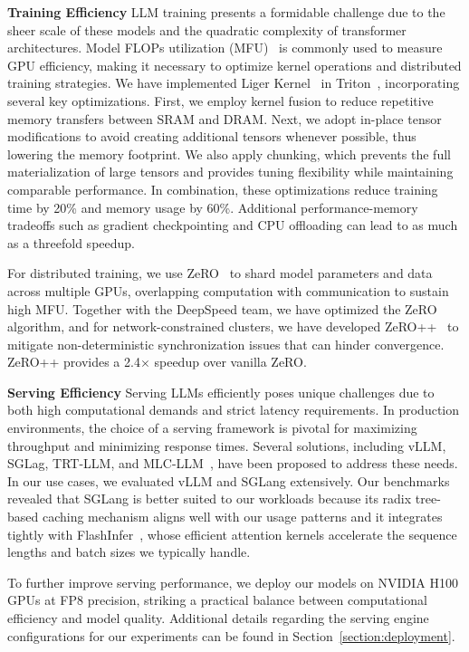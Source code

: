 \noindent
\textbf{Training Efficiency} LLM training presents a formidable challenge due to the sheer scale of these models and the quadratic complexity of transformer architectures. Model FLOPs utilization (MFU)~\cite{chowdhery2023palm} is commonly used to measure GPU efficiency, making it necessary to optimize kernel operations and distributed training strategies. We have implemented Liger Kernel~\cite{hsu2024liger} in Triton~\cite{tillet2019triton}, incorporating several key optimizations. First, we employ kernel fusion to reduce repetitive memory transfers between SRAM and DRAM. Next, we adopt in-place tensor modifications to avoid creating additional tensors whenever possible, thus lowering the memory footprint. We also apply chunking, which prevents the full materialization of large tensors and provides tuning flexibility while maintaining comparable performance. In combination, these optimizations reduce training time by 20\% and memory usage by 60\%. Additional performance-memory tradeoffs such as gradient checkpointing and CPU offloading can lead to as much as a threefold speedup.

For distributed training, we use ZeRO~\cite{rajbhandari2020zero} to shard model parameters and data across multiple GPUs, overlapping computation with communication to sustain high MFU. Together with the DeepSpeed team, we have optimized the ZeRO algorithm, and for network-constrained clusters, we have developed ZeRO++~\cite{wang2023zero++,dai2024enhancing} to mitigate non-deterministic synchronization issues that can hinder convergence. ZeRO++ provides a 2.4$\times$ speedup over vanilla ZeRO.



\noindent
\textbf{Serving Efficiency} Serving LLMs efficiently poses unique challenges due to both high computational demands and strict latency requirements. In production environments, the choice of a serving framework is pivotal for maximizing throughput and minimizing response times. Several solutions, including vLLM, SGLag, TRT-LLM, and MLC-LLM~\cite{kwon2023vllm,zheng2024sglang,TRT-LLM,mlc-llm}, have been proposed to address these needs. In our use cases, we evaluated vLLM and SGLang extensively. Our benchmarks revealed that SGLang is better suited to our workloads because its radix tree-based caching mechanism aligns well with our usage patterns and it integrates tightly with FlashInfer~\cite{ye2025flashinfer}, whose efficient attention kernels accelerate the sequence lengths and batch sizes we typically handle.

To further improve serving performance, we deploy our models on NVIDIA H100 GPUs at FP8 precision, striking a practical balance between computational efficiency and model quality. Additional details regarding the serving engine configurations for our experiments can be found in Section~\ref{section:deployment}.




